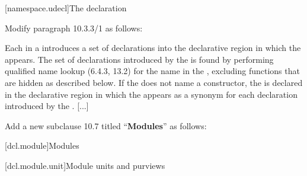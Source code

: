 \setcounter{subsection}{2}
[namespace.udecl]{The  declaration}

Modify paragraph 10.3.3/1 as follows:
\begin{std.txt}
  \resetalinea[0]
  \alinea
  Each  in a 
  introduces a set of declarations  into the declarative 
  region in which the
   appears.  The set of declarations
   introduced by
  the  is found by performing qualified name
  lookup (6.4.3, 13.2) for the name in the ,
  excluding functions that are hidden as described below.  If the
   does not name a constructor, the 
   is declared in the declarative region in which
  the  appears as a synonym for each
  declaration  
  introduced by the . [...]
\end{std.txt}


\noindent
Add a new subclause 10.7 titled ``\textbf{Modules}'' as follows:

\setcounter{section}{6}
[dcl.module]{Modules}%

[dcl.module.unit]{Module units and purviews}

